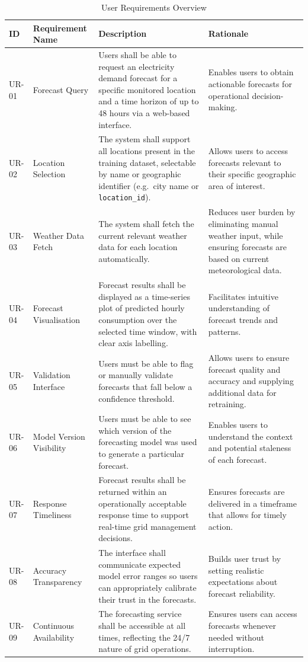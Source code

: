 \documentclass[12pt, a4paper]{report}
\begin{document}
\begin{table}[!h]
    \centering
    \caption{User Requirements Overview}
    \begin{tabular}{p{1cm}|p{2.6cm}|p{6cm}|p{4.5cm}}
        \toprule
        \textbf{ID} & \textbf{Requirement Name} & \textbf{Description} & \textbf{Rationale} \\
        \hline
        UR-01 & Forecast Query & Users shall be able to request an electricity demand forecast for a specific monitored location and a time horizon of up to 48 hours via a web-based interface. & Enables users to obtain actionable forecasts for operational decision-making. \\
        \hline
        UR-02 & Location Selection & The system shall support all locations present in the training dataset, selectable by name or geographic identifier (e.g.\ city name or \texttt{location\_id}). & Allows users to access forecasts relevant to their specific geographic area of interest. \\
        \hline
        UR-03 & Weather Data Fetch & The system shall fetch the current relevant weather data for each location automatically. & Reduces user burden by eliminating manual weather input, while ensuring forecasts are based on current meteorological data. \\
        \hline
        UR-04 & Forecast Visualisation & Forecast results shall be displayed as a time-series plot of predicted hourly consumption over the selected time window, with clear axis labelling. & Facilitates intuitive understanding of forecast trends and patterns. \\
        \hline
        UR-05 & Validation Interface & Users must be able to flag or manually validate forecasts that fall below a confidence threshold. & Allows users to ensure forecast quality and accuracy and supplying additional data for retraining. \\
        \hline
        UR-06 & Model Version Visibility & Users must be able to see which version of the forecasting model was used to generate a particular forecast. & Enables users to understand the context and potential staleness of each forecast. \\
        \hline
        UR-07 & Response Timeliness & Forecast results shall be returned within an operationally acceptable response time to support real-time grid management decisions. & Ensures forecasts are delivered in a timeframe that allows for timely action. \\
        \hline
        UR-08 & Accuracy Transparency & The interface shall communicate expected model error ranges so users can appropriately calibrate their trust in the forecasts. & Builds user trust by setting realistic expectations about forecast reliability. \\
        \hline
        UR-09 & Continuous Availability & The forecasting service shall be accessible at all times, reflecting the 24/7 nature of grid operations. & Ensures users can access forecasts whenever needed without interruption. \\
        \bottomrule
    \end{tabular}
    \label{tab:user-requirements}
\end{table}
\end{document}
